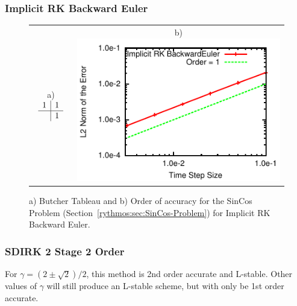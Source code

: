\subsubsection{Implicit RK Backward Euler}

\begin{figure}[H]
\centering{}%
\begin{tabular}{cc}
a) $\begin{array}{c|c}
1 & 1\\
\hline  & 1
\end{array}$ & b)\includegraphics[scale=1.5]{figures/IRK_BackwardEuler}\tabularnewline
\end{tabular}\caption{a) Butcher Tableau and b) Order of accuracy for the SinCos Problem
(Section~\ref{rythmos:sec:SinCos-Problem}) for Implicit RK Backward
Euler.}
\end{figure}



\subsubsection{SDIRK 2 Stage 2 Order}

For $\gamma=(2\pm\sqrt{2})/2$, this method is 2nd order accurate
and L-stable. Other values of $\gamma$ will still produce an L-stable
scheme, but with only be 1st order accurate.

